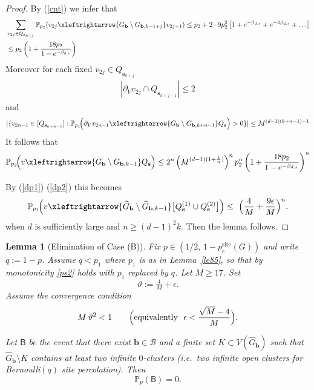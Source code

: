 \documentclass[11pt]{amsart}
\theoremstyle{plain}
\newtheorem{lemma}[theorem]{Lemma}
\numberwithin{equation}{section}
\numberwithin{figure}{section}
\newcommand\PP{{\mathbb P}}
\begin{document}
\begin{proof}
By (\ref{cnt}) we infer that 
\begin{align*}
&\sum_{v_{2j}\in Q_{\mathbf{s}_{k+j}}}\PP_{p_2}(v_{2j}\xleftrightarrow{G_{\mathbf{b}}\setminus G_{\mathbf{b},k-1+j}} v_{2j+1})
\leq p_2+2\cdot 9p_2^2\left[1+e^{-
\beta_{d,\epsilon}}+e^{-2
\beta_{d,\epsilon}}+\ldots\right]\\
&\leq p_2\left(1+\frac{18p_2}{1-e^{-\beta_{d,\epsilon}}}\right)
\end{align*}
Moreover for each fixed $v_{2j}\in Q_{\mathbf{s}_{k+j}}$
\begin{align*}
|\partial_V v_{2j}\cap Q_{\mathbf{s}_{k+j-1}}|\leq 2
\end{align*}
and
\begin{align*}
|\{v_{2n-1}\in  [Q_{\mathbf{s}_{k+n-1}}]:\PP_{p_1}\!\Bigl(\partial_V v_{2n-1}
\xleftrightarrow{ G_{\mathbf b}\setminus G_{\mathbf b,k+n-1}}
Q_{\mathbf s}
\Bigr)>0\}|\leq M^{(d-1)(k+n-1)-1}
\end{align*}
It follows that 
\begin{align*}
\PP_{p_2}\!\Bigl(
v\xleftrightarrow{ G_{\mathbf b}\setminus G_{\mathbf b,k-1}}
Q_{\mathbf s}
\Bigr)\leq 2^n\left(M^{(d-1)(1+\frac{k}{n})}\right)^np_2^n\left(1+\frac{18p_2}{1-e^{-\beta_{d,\epsilon}}}\right)^n
\end{align*}


By (\ref{dp1}) (\ref{dp2}) this becomes
\[\PP_{p_1}\!\Bigl(
v\xleftrightarrow{ \widehat{G}_{\mathbf b}\setminus \widehat{G}_{\mathbf b,k-1}}
\bigl[Q_{\mathbf s}^{(1)}\cup Q_{\mathbf s}^{(2)}\bigr]
\Bigr)
\le\ \Bigl(\frac{4}{M}+\frac{9\epsilon}{M}\Bigr)^n.
\]
when $d$ is sufficiently large and $n\geq (d-1)^2 k$. Then the lemma follows.

\end{proof}





\begin{lemma}[Elimination of Case (B)]\label{lem713}
Fix $p\in(1/2,\,1-p_c^{\mathrm{site}}(G))$ and write $q:=1-p$.
Assume $q<p_1$ where $p_1$ is as in Lemma~\ref{le85}, so that by monotonicity
\eqref{ps2} holds with $p_1$ replaced by $q$.
Let $M\geq 17$. Set
\[
\vartheta:=\tfrac4M+\epsilon.
\]
Assume the convergence condition
\begin{equation}\label{eq:theta-cond}
M\,\vartheta^2<1
\qquad\Bigl(\text{equivalently }\ \epsilon<\frac{\sqrt{M}-4}{M}\Bigr).
\end{equation}

Let $\mathsf{B}$ be the event that there exist $\mathbf b\in\mathcal B$ and a finite set
$K\subset V(\widehat G_{\mathbf b})$ such that $\widehat G_{\mathbf b}\setminus K$ contains at least
two infinite $0$-clusters (i.e.\ two infinite open clusters for Bernoulli$(q)$ site percolation).
Then
\[
\PP_p(\mathsf{B})=0.
\]
\end{lemma}
\end{document}
